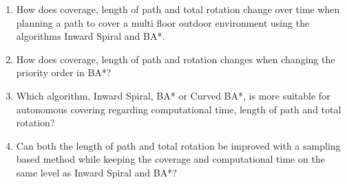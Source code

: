 \begin{enumerate}





\item How does coverage, length of path and total rotation change over time when planning a path to cover a multi floor outdoor environment using the algorithms Inward Spiral and BA*.

\item How does coverage, length of path and rotation changes when changing the priority order in BA*?

\item  Which algorithm, Inward Spiral, BA* or Curved BA*, is more suitable for autonomous covering regarding computational time, length of path and total rotation?

\item Can both the length of path and total rotation be improved with a sampling based method while keeping the coverage and computational time on the same level as Inward Spiral and BA*?

\end{enumerate}




